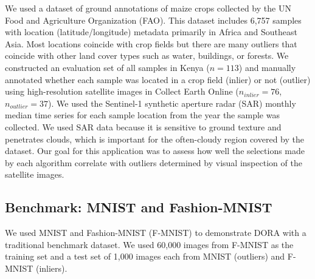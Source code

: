\documentclass[utf8]{frontiersFPHY} %
\newcommand{\todo}[1]{\textcolor{blue}{#1}}
\begin{document}
We used a dataset of ground annotations of maize crops collected by the UN Food
and Agriculture Organization (FAO). This dataset includes 6,757 samples
with location (latitude/longitude) metadata primarily in Africa and Southeast
Asia. Most locations coincide with crop
fields but there are many outliers that coincide with other land cover types 
such as water, buildings, or forests. We constructed an evaluation set 
of all samples in Kenya ($n=113$) and manually annotated whether 
each sample was located in a crop field (inlier) or not (outlier)
using high-resolution satellite images in Collect Earth 
Online ($n_{inlier}=76$, $n_{outlier}=37$). We used the Sentinel-1 
synthetic aperture radar (SAR) monthly median
time series for each sample location from the year the sample was 
collected. We used SAR data because it is sensitive to ground texture and
penetrates clouds, which is important for the often-cloudy region covered
by the dataset. Our goal for this application was to assess how well the 
selections made by each algorithm correlate with outliers determined by
visual inspection of the satellite images.


\subsection{Benchmark: MNIST and Fashion-MNIST}
We used MNIST and Fashion-MNIST (F-MNIST) to demonstrate DORA with a
traditional benchmark dataset. We used 60,000 images from 
F-MNIST as the training set and a test set of 1,000 images 
each from MNIST (outliers) and F-MNIST (inliers). 
\end{document}
